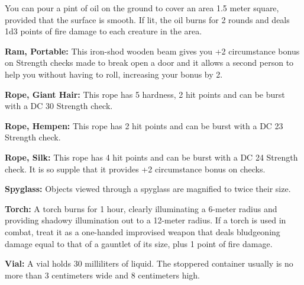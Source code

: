 You can pour a pint of oil on the ground to cover an area 1.5 meter square, provided that the surface is smooth. If lit, the oil burns for 2 rounds and deals 1d3 points of fire damage to each creature in the area.

\textbf{Ram, Portable:} This iron-shod wooden beam gives you +2 circumstance bonus on Strength checks made to break open a door and it allows a second person to help you without having to roll, increasing your bonus by 2.

\textbf{Rope, Giant Hair:} This rope has 5 hardness, 2 hit points and can be burst with a DC 30 Strength check.

\textbf{Rope, Hempen:} This rope has 2 hit points and can be burst with a DC 23 Strength check.

\textbf{Rope, Silk:} This rope has 4 hit points and can be burst with a DC 24 Strength check. It is so supple that it provides +2 circumstance bonus on  checks.

\textbf{Spyglass:} Objects viewed through a spyglass are magnified to twice their size.

\textbf{Torch:} A torch burns for 1 hour, clearly illuminating a 6-meter radius and providing shadowy illumination out to a 12-meter radius. If a torch is used in combat, treat it as a one-handed improvised weapon that deals bludgeoning damage equal to that of a gauntlet of its size, plus 1 point of fire damage.

\textbf{Vial:} A vial holds 30 milliliters of liquid. The stoppered container usually is no more than 3 centimeters wide and 8 centimeters high.
